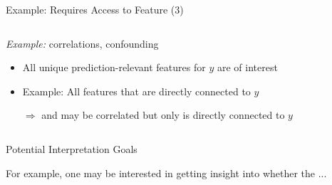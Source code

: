 \documentclass[11pt,compress,t,notes=noshow, aspectratio=169, xcolor=table]{beamer}
\begin{document}
\begin{frame}{Example: Requires Access to Feature (3)}
\begin{columns}[T, totalwidth=\textwidth]
\begin{column}{0.48\textwidth}
   \textit{Example:} correlations, confounding
  
  \pause
      \begin{itemize}
      \item All unique prediction-relevant features for $y$ are of interest
      \item Example: All features that are directly connected to $y$
      \item[$\Rightarrow$]  and  may be correlated but only  is directly connected to $y$
  \end{itemize}
  \end{column}
\end{columns}  
\end{frame}


\begin{frame}{Potential Interpretation Goals}


For example, one may be interested in getting insight into whether the ...


\end{frame}
\end{document}
